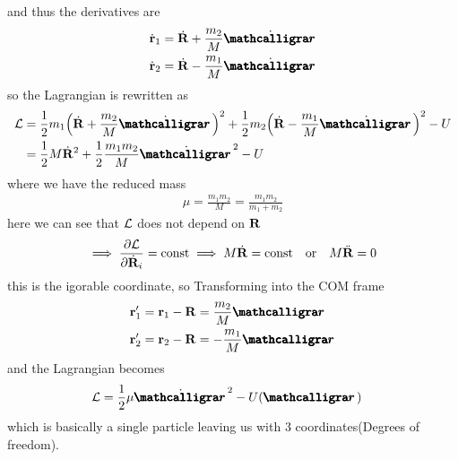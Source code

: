 \documentclass[../main.tex]{subfiles}
\begin{document}
and thus the derivatives are
\begin{align*}
    \dot {\vb r}_1 &= \dot {\vb R} + \frac{m_2}{M} \dot {\boldscriptr} \\
    \dot {\vb r}_2 &= \dot {\vb R} - \frac{m_1}{M} \dot {\boldscriptr}
\end{align*}
so the Lagrangian is rewritten as
\begin{align*}
    \lagr &= \frac{1}{2} m_1 \qt(\dot{\vb R} + \frac{m_2}{M} \dot{\boldscriptr})^2 
        + \frac{1}{2} m_2 \qt(\dot{\vb R} - \frac{m_1}{M} \dot{\boldscriptr})^2 - U \\
    &= \frac{1}{2} M \dot{\vb R}^2 + \frac{1}{2} \frac{m_1 m_2}{M} \dot{\boldscriptr}^2 - U
\end{align*}
where we have the reduced mass
\begin{align*}
    \mu = \frac{m_1 m_2}{M} = \frac{m_1 m_2}{m_1 + m_2}
\end{align*}
here we can see that $\mathcal{L}$ does not depend on $\vb R$
\begin{align*}
    \implies \pdv{\lagr}{\dot{\vb R}_i} = \text{const} \implies M\dot{\vb R} = \text{const} \qor 
    M \ddot{\vb R} = 0
\end{align*}
this is the igorable coordinate, so Transforming into the COM frame
\begin{align*}
    \vb r_1' &= \vb r_1 - \vb R = \frac{m_2}{M} \boldscriptr \\
    \vb r_2' &= \vb r_2 - \vb R = -\frac{m_1}{M} \boldscriptr
\end{align*}
and the Lagrangian becomes
\begin{align*}
    \lagr &= \frac{1}{2} \mu \dot{\boldscriptr}^2 - U(\boldscriptr)
\end{align*}
which is basically a single particle leaving us with 3 coordinates(Degrees of freedom).
\end{document}
